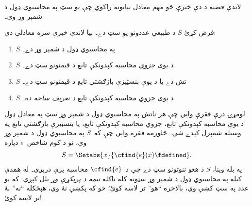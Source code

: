 \documentclass[../../../include/open-logic-section]{subfiles}
\begin{document}



لاندې قضيه د دې خبرې څو مهم معادل بيانونه راکوي چې يو سټ په محاسبوي
ډول د شمېر وړ وي۔

\begin{thm}
فرض کړئ $S$ د طبيعي عددونو يو سټ دے۔ بيا لاندې خبرې سره معادلې دي:
\begin{enumerate}
\item{} $S$ په محاسبوي ډول د شمېر وړ دے۔
\item{} $S$ د يوې \emph{جزوي} محاسبه کېدونکې تابع
د قيمتونو سټ دے۔
\item{} $S$ تش دے يا د يوې بنسټيزې بازګشتي تابع
د قيمتونو سټ دے۔
\item{} $S$ د يوې جزوي محاسبه کېدونکې تابع
\emph{د تعريف ساحه} ده۔
\end{enumerate}
\end{thm}

\begin{explain}
لومړۍ درې فقرې وايي چې هر ناتش په محاسبوي ډول د شمېر وړ سټ په معادل
ډول د يوې محاسبه کېدونکې تابع، جزوي محاسبه کېدونکې تابع، يا بنسټيزې
بازګشتي تابع په وسيله شمېرل کېدے شي۔ څلورمه فقره وايي چې که~$S$ په
محاسبوي ډول د شمېر وړ وي، نو د کوم شاخص~$e$ دپاره
\[
S = \Setabs{x}{\cfind{e}(x) \fdefined}.
\]
په بله وينا، $S$ د هغو ننوتونو سټ دے چې د~$\cfind{e}$ محاسبه پرې
درېږي۔ له همدې کبله په محاسبوي ډول د شمېر وړ سټونه کله ناکله
\emph{نيمه د پرېکړې وړ} بلل کېږي: که يو عدد په سټ کښې وي، بالاخره
``هو'' تر لاسه کوئ؛ خو که پکښې نۀ وي، هېڅکله ``نه'' نۀ تر لاسه
کوئ!{}
\end{explain}
\end{document}
